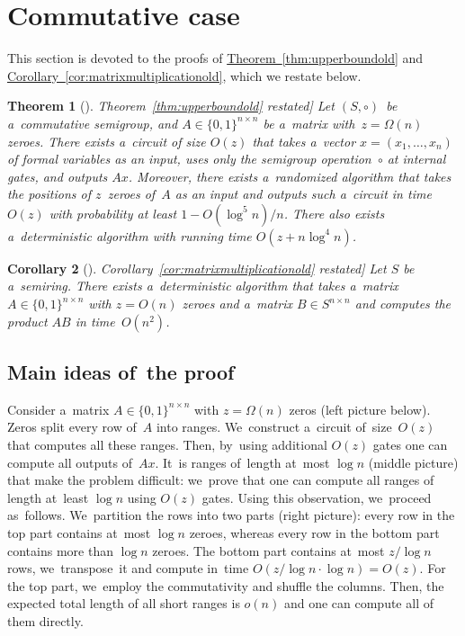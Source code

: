 \documentclass[11pt]{article}
\numberwithin{equation}{section}
\newtheorem{theorem}{Theorem}[section]
\newtheorem{corollary}[theorem]{Corollary}
\theoremstyle{definition}
\theoremstyle{plain}
\newcommand{\expref}[2]{\hyperref[#2]{#1~\ref{#2}}}
\theoremstyle{plain}\newtheorem{observation}[theorem]{Observation}
\begin{document}
\section{Commutative case}\label{sec-commutative}

This section is devoted to the proofs of \expref{Theorem}{thm:upperboundold} and
\expref{Corollary}{cor:matrixmultiplicationold}, which we %
restate  %
below.

%
\begin{theorem}[\expref{Theorem}{thm:upperboundold} restated]
    \label{thm:upperbound}
	Let $(S, \circ)$~be a~commutative semigroup,
	and $A \in \{0,1\}^{n \times n}$ be a~matrix
	with~$z=\Omega(n)$ zeroes.
	There exists a~circuit of size $O(z)$ that takes
	a~vector $x = (x_1,\ldots, x_n)$ of formal variables as an input,
	uses only the semigroup operation~$\circ$ at internal gates,
	and outputs $Ax$. Moreover, there exists a~randomized
	algorithm that takes the positions of $z$~zeroes of~$A$
	as an input and outputs such a~circuit in time $O(z)$
	with probability at least $1-O(\log^5n)/n$. There also
	exists a~deterministic algorithm with running time $O(z+n\log^4n)$.
\end{theorem}

%
%
%
%
%
%
%
%
%
%
%
%
%

\begin{corollary}[\expref{Corollary}{cor:matrixmultiplicationold} restated]
    \label{cor:matrixmultiplication}
    Let $S$ be a~semiring. There exists a~deterministic algorithm that takes a~matrix
    ${A \in \{0,1\}^{n \times n}}$ with $z=O(n)$ zeroes and a~matrix
    $B \in S^{n \times n}$ and computes the product $AB$ in time~$O(n^2)$.
\end{corollary}

\subsection{Main ideas of~the proof}

Consider a~matrix $A \in \{0,1\}^{n \times n}$
with $z=\Omega(n)$ zeros (left picture below).
Zeros split every row of~$A$ into ranges.
We~construct a~circuit of~size~$O(z)$ that computes all these ranges. Then, by~using additional $O(z)$ gates one can
compute all outputs of~$Ax$. It~is ranges of~length at~most $\log n$ (middle picture) that make the problem difficult:
we~prove that one can compute
all ranges of length at~least $\log n$ using $O(z)$ gates.
Using this observation, we~proceed as~follows.
We~partition the rows into two parts (right picture): every row in the top part contains at~most $\log n$ zeroes, whereas every row in the bottom part contains more than $\log n$ zeroes. The bottom part contains at~most $z/\log n$
%
rows,
we~transpose~it and compute in~time $O(z/\log n \cdot \log n)=O(z)$. For the top part, we~employ the commutativity and shuffle the columns. Then, the expected total length of all short ranges is $o(n)$ and one can
compute all of them directly.
\end{document}
